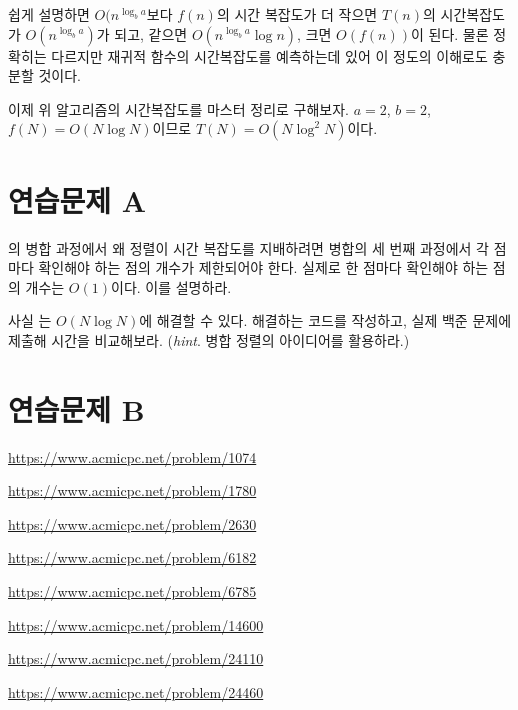쉽게 설명하면 $O(n^{\log_b a}$보다 $f(n)$의 시간 복잡도가 더 작으면 $T(n)$의 시간복잡도가 $O(n^{\log_b a})$가 되고, 같으면 $O(n^{\log_b a} \log n)$, 크면 $O(f(n))$이 된다. 물론 정확히는 다르지만 재귀적 함수의 시간복잡도를 예측하는데 있어 이 정도의 이해로도 충분할 것이다.

이제 위 알고리즘의 시간복잡도를 마스터 정리로 구해보자. $a=2$, $b=2$, $f(N)=O(N \log N)$이므로 $T(N) = O(N \log^2 N)$이다.

\section{연습문제 A}
\begin{problem} \label{pb: dnc-merge-time}
    의 병합 과정에서 왜 정렬이 시간 복잡도를 지배하려면 병합의 세 번째 과정에서 각 점마다 확인해야 하는 점의 개수가 제한되어야 한다. 실제로 한 점마다 확인해야 하는 점의 개수는 $O(1)$이다. 이를 설명하라.
\end{problem}
\begin{problem}
    사실 는 $O(N \log N)$에 해결할 수 있다. 해결하는 코드를 작성하고, 실제 백준 문제에 제출해 시간을 비교해보라. (\textit{hint}. 병합 정렬의 아이디어를 활용하라.)
\end{problem}

\section{연습문제 B}

\begin{problem} \url{https://www.acmicpc.net/problem/1074} \end{problem}
\begin{problem} \url{https://www.acmicpc.net/problem/1780} \end{problem}
\begin{problem} \url{https://www.acmicpc.net/problem/2630} \end{problem}
\begin{problem} \url{https://www.acmicpc.net/problem/6182} \end{problem}
\begin{problem} \url{https://www.acmicpc.net/problem/6785} \end{problem}
\begin{problem} \url{https://www.acmicpc.net/problem/14600} \end{problem}
\begin{problem} \url{https://www.acmicpc.net/problem/24110} \end{problem}
\begin{problem} \url{https://www.acmicpc.net/problem/24460} \end{problem}

